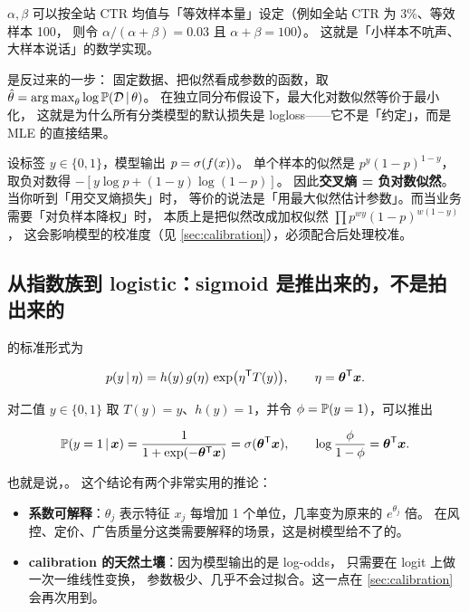 $\alpha,\beta$ 可以按全站 CTR 均值与「等效样本量」设定（例如全站 CTR 为 3\%、等效样本 100，
则令 $\alpha/(\alpha+\beta) = 0.03$ 且 $\alpha+\beta = 100$）。
这就是「小样本不吭声、大样本说话」的数学实现。

 是反过来的一步：
固定数据、把似然看成参数的函数，取 $\hat{\theta} = \operatorname*{arg\,max}_\theta \log \operatorname{\mathbb{P}}(\mathcal{D}\,\vert\,\theta)$。
在独立同分布假设下，最大化对数似然等价于最小化，
这就是为什么所有分类模型的默认损失是 logloss——它不是「约定」，而是 MLE 的直接结果。

\begin{insight}
设标签 $y \in \{0,1\}$，模型输出 $p = \operatorname{\sigma}(f(x))$。
单个样本的似然是 $p^{y}(1-p)^{1-y}$，取负对数得 $-[y\log p + (1-y)\log(1-p)]$。
因此\textbf{交叉熵 = 负对数似然}。当你听到「用交叉熵损失」时，
等价的说法是「用最大似然估计参数」。而当业务需要「对负样本降权」时，
本质上是把似然改成加权似然 $\prod p^{w y}(1-p)^{w(1-y)}$，
这会影响模型的校准度（见 \cref{sec:calibration}），必须配合后处理校准。
\end{insight}

\subsection{从指数族到 logistic：sigmoid 是推出来的，不是拍出来的}

 的标准形式为

\begin{equation}
p(y \,\vert\, \eta) = h(y)\, g(\eta)\, \exp\!\big(\eta^{\mathsf{T}} T(y)\big),
\qquad
\eta = \bm{\theta}^{\mathsf{T}} \bm{x} .
\label{eq:expfamily}
\end{equation}

对二值 $y \in \{0,1\}$ 取 $T(y)=y$、$h(y)=1$，并令 $\phi = \operatorname{\mathbb{P}}(y=1)$，可以推出

\begin{equation}
\operatorname{\mathbb{P}}(y=1 \,\vert\, \bm{x}) = \frac{1}{1 + \exp(-\bm{\theta}^{\mathsf{T}}\bm{x})} = \operatorname{\sigma}(\bm{\theta}^{\mathsf{T}}\bm{x}),
\qquad
\log\frac{\phi}{1-\phi} = \bm{\theta}^{\mathsf{T}}\bm{x} .
\label{eq:logistic}
\end{equation}

也就是说，。
这个结论有两个非常实用的推论：

\begin{itemize}
  \item \textbf{系数可解释}：$\theta_j$ 表示特征 $x_j$ 每增加 1 个单位，几率变为原来的 $e^{\theta_j}$ 倍。
        在风控、定价、广告质量分这类需要解释的场景，这是树模型给不了的。
  \item \textbf{calibration 的天然土壤}：因为模型输出的是 log-odds，
         只需要在 logit 上做一次一维线性变换，
        参数极少、几乎不会过拟合。这一点在 \cref{sec:calibration} 会再次用到。
\end{itemize}

